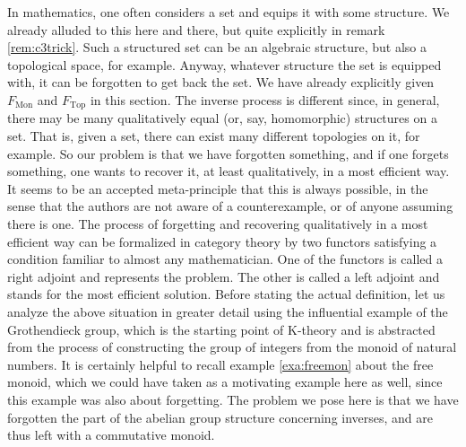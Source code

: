 In mathematics, one often considers a set and equips it with some structure.
We already alluded to this here and there, but quite explicitly in remark \ref{rem:c3trick}.
Such a structured set can be an algebraic structure, but also a topological space, for example.
Anyway, whatever structure the set is equipped with, it can be forgotten to get back the set.
We have already explicitly given $F_{\mathrm{Mon}}$ and $F_{\mathrm{Top}}$ in this section.
The inverse process is different since, in general, there may be many qualitatively equal (or, say, homomorphic) structures on a set.
That is, given a set, there can exist many different topologies on it, for example.
So our problem is that we have forgotten something, and if one forgets something, one wants to recover it, at least qualitatively, in a most efficient way.
It seems to be an accepted meta-principle that this is always possible, in the sense that the authors are not aware of a counterexample, or of anyone assuming there is one.
The process of forgetting and recovering qualitatively in a most efficient way can be formalized in category theory by two functors satisfying a condition familiar to almost any mathematician.
One of the functors is called a right adjoint and represents the problem.
The other is called a left adjoint and stands for the most efficient solution.
Before stating the actual definition, let us analyze the above situation in greater detail using the influential example of the Grothendieck group, which is the starting point of K-theory and is abstracted from the process of constructing the group of integers from the monoid of natural numbers.
It is certainly helpful to recall example \ref{exa:freemon} about the free monoid, which we could have taken as a motivating example here as well, since this example was also about forgetting.
The problem we pose here is that we have forgotten the part of the abelian group structure concerning inverses, and are thus left with a commutative monoid.
\\
